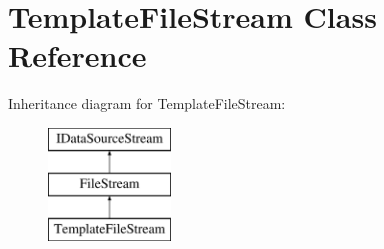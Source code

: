 \hypertarget{class_template_file_stream}{}\section{Template\+File\+Stream Class Reference}
\label{class_template_file_stream}
Inheritance diagram for Template\+File\+Stream\+:\begin{figure}[H]
\begin{center}
\leavevmode
\includegraphics[height=3.000000cm]{class_template_file_stream}
\end{center}
\end{figure}
